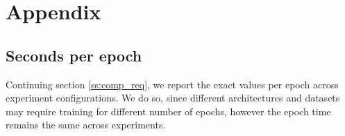 \newpage

\section{Appendix}

\subsection{Seconds per epoch}

Continuing section \ref{ss:comp_req}, we report the exact values per epoch across experiment configurations. We do so, since different architectures and datasets may require training for different number of epochs, however the epoch time remains the same across experiments.

\begin{table*}[hbt!]
  \begin{center}
\end{center}
\caption{Average seconds per epoch across experimental setups and ways}
\label{table:epoch_time}
\end{table*}

